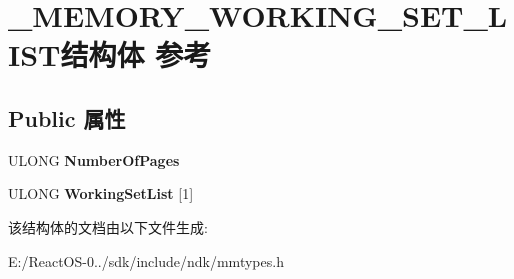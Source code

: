 \hypertarget{struct___m_e_m_o_r_y___w_o_r_k_i_n_g___s_e_t___l_i_s_t}{}\section{\+\_\+\+M\+E\+M\+O\+R\+Y\+\_\+\+W\+O\+R\+K\+I\+N\+G\+\_\+\+S\+E\+T\+\_\+\+L\+I\+S\+T结构体 参考}
\label{struct___m_e_m_o_r_y___w_o_r_k_i_n_g___s_e_t___l_i_s_t}
\subsection*{Public 属性}
\begin{DoxyCompactItemize}
\item 
\mbox{\label{struct___m_e_m_o_r_y___w_o_r_k_i_n_g___s_e_t___l_i_s_t_a8e41a87d7968e5c4bc20c3e2770680c6}} 
U\+L\+O\+NG {\bfseries Number\+Of\+Pages}
\item 
\mbox{\label{struct___m_e_m_o_r_y___w_o_r_k_i_n_g___s_e_t___l_i_s_t_a804140f96865f346c3e5e366cd26394e}} 
U\+L\+O\+NG {\bfseries Working\+Set\+List} \mbox{[}1\mbox{]}
\end{DoxyCompactItemize}


该结构体的文档由以下文件生成\+:\begin{DoxyCompactItemize}
\item 
E\+:/\+React\+O\+S-\/0../sdk/include/ndk/mmtypes.\+h\end{DoxyCompactItemize}
